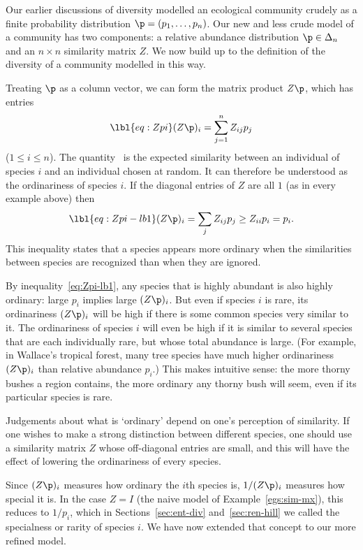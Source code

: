 Our earlier discussions of diversity modelled an ecological community
crudely as a finite probability distribution $\p = (p_1, \ldots, p_n)$.
Our new and less crude model of a community has two components: a relative
abundance distribution $\p \in \Delta_n$ and an $n \times n$ similarity
matrix $Z$.  We now build up to the definition of the diversity of a
community modelled in this way.

Treating $\p$ as a column vector, we can form the matrix product $Z\p$,
which has entries
% 
\begin{equation}
\lbl{eq:Zpi}
(Z\p)_i
=
\sum_{j = 1}^n Z_{ij} p_j
\end{equation}
% 
($1 \leq i \leq n$).  The quantity~ is the expected similarity
between an individual of species $i$ and an individual chosen at random.
It can therefore be understood as the ordinariness of
species $i$.  If the diagonal entries of $Z$ are all $1$ (as in every
example above) then
% 
\begin{equation}
\lbl{eq:Zpi-lb1}
(Z\p)_i = \sum_j Z_{ij} p_j \geq Z_{ii} p_i = p_i.
\end{equation}
% 
This inequality states that a species appears more ordinary when the
similarities between species are recognized than when they are
ignored. 

By inequality~\eqref{eq:Zpi-lb1}, any species that is highly abundant is
also highly ordinary: large $p_i$ implies large $(Z\p)_i$.  But even if
species $i$ is rare, its ordinariness $(Z\p)_i$ will be high if there is
some common species very similar to it.  The ordinariness of species $i$
will even be high if it is similar to several species that are each
individually rare, but whose total abundance is large. (For example, in
Wallace's%
%
% 
tropical forest,%
%
% 
many tree species have much higher ordinariness $(Z\p)_i$ than relative
abundance $p_i$.)  This makes intuitive sense: the more
thorny bushes a region contains, the more
ordinary any thorny bush will seem, even if its particular species is rare.

Judgements about what is `ordinary' depend on one's perception of
similarity.  If one wishes to make a strong distinction between different
species, one should use a similarity%
%
% 
matrix $Z$ whose off-diagonal entries are small, and this will have the
effect of lowering the ordinariness of every species.

Since $(Z\p)_i$ measures how ordinary the $i$th species is, $1/(Z\p)_i$
measures how special it is.  In the case $Z = I$ (the naive model of
Example~\ref{egs:sim-mx}), this reduces to $1/p_i$,
which in Sections~\ref{sec:ent-div} and~\ref{sec:ren-hill} we called the
specialness or rarity of species $i$.  We
have now extended that concept to our more refined model.

